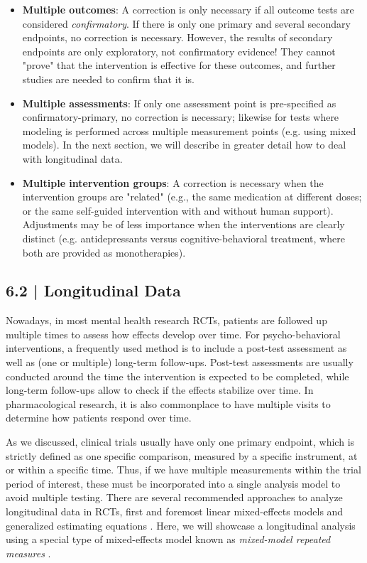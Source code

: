 \begin{itemize}
    \item \textbf{Multiple outcomes}: A correction is only necessary if all outcome tests are considered \emph{confirmatory}. If there is only one primary and several secondary endpoints, no correction is necessary. However, the results of secondary endpoints are only exploratory, not confirmatory evidence! They cannot "prove" that the intervention is effective for these outcomes, and further studies are needed to confirm that it is.
    \item \textbf{Multiple assessments}: If only one assessment point is pre-specified as confirmatory-primary, no correction is necessary; likewise for tests where modeling is performed across multiple measurement points (e.g. using mixed models). In the next section, we will describe in greater detail how to deal with longitudinal data.
    \item \textbf{Multiple intervention groups}: A correction is necessary when the intervention groups are "related" (e.g., the same medication at different doses; or the same self-guided intervention with and without human support). Adjustments may be of less importance when the interventions are clearly distinct (e.g. antidepressants versus cognitive-behavioral treatment, where both are provided as monotherapies).
\end{itemize}


\subsection{{\normalfont\textsf{\textcolor{sBlue}{\small 6.2 |}}} Longitudinal Data}

Nowadays, in most mental health research RCTs, patients are followed up multiple times to assess how effects develop over time. For psycho-behavioral interventions, a frequently used method is to include a post-test assessment as well as (one or multiple) long-term follow-ups. Post-test assessments are usually conducted around the time the intervention is expected to be completed, while long-term follow-ups allow to check if the effects stabilize over time. In pharmacological research, it is also commonplace to have multiple visits to determine how patients respond over time.

As we discussed, clinical trials usually have only one primary endpoint, which is strictly defined as one specific comparison, measured by a specific instrument, at or within a specific time. Thus, if we have multiple measurements within the trial period of interest, these must be incorporated into a single analysis model to avoid multiple testing. There are several recommended approaches to analyze longitudinal data in RCTs, first and foremost linear mixed-effects models and generalized estimating equations \citep[GEE;][chap. 3.4]{twiskbook}. Here, we will showcase a longitudinal analysis using a special type of mixed-effects model known as \emph{mixed-model repeated measures} \citep[MMRM;][]{mallinckrod2008recommendations}.


